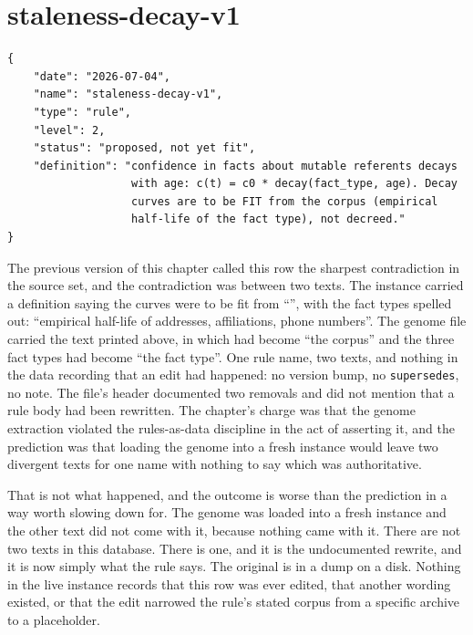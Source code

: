 \section{staleness-decay-v1}
\label{sec:staleness}

\begin{lstlisting}[language={},basicstyle=\ttfamily\footnotesize]
{
    "date": "2026-07-04",
    "name": "staleness-decay-v1",
    "type": "rule",
    "level": 2,
    "status": "proposed, not yet fit",
    "definition": "confidence in facts about mutable referents decays
                   with age: c(t) = c0 * decay(fact_type, age). Decay
                   curves are to be FIT from the corpus (empirical
                   half-life of the fact type), not decreed."
}
\end{lstlisting}

The previous version of this chapter called this row the sharpest contradiction in the source set, and the contradiction was between two texts. The \labLineageName{} instance carried a definition saying the curves were to be fit from ``\labCorpus'', with the fact types spelled out: ``empirical half-life of addresses, affiliations, phone numbers''. The genome file carried the text printed above, in which \labCorpus{} had become ``the corpus'' and the three fact types had become ``the fact type''. One rule name, two texts, and nothing in the data recording that an edit had happened: no version bump, no \texttt{supersedes}, no note. The file's header documented two removals and did not mention that a rule body had been rewritten. The chapter's charge was that the genome extraction violated the rules-as-data discipline in the act of asserting it, and the prediction was that loading the genome into a fresh instance would leave two divergent texts for one name with nothing to say which was authoritative.

That is not what happened, and the outcome is worse than the prediction in a way worth slowing down for. The genome was loaded into a fresh instance and the other text did not come with it, because nothing came with it. There are not two texts in this database. There is one, and it is the undocumented rewrite, and it is now simply what the rule says. The original is in a \labLineageSize{} dump on a disk. Nothing in the live instance records that this row was ever edited, that another wording existed, or that the edit narrowed the rule's stated corpus from a specific archive to a placeholder.

